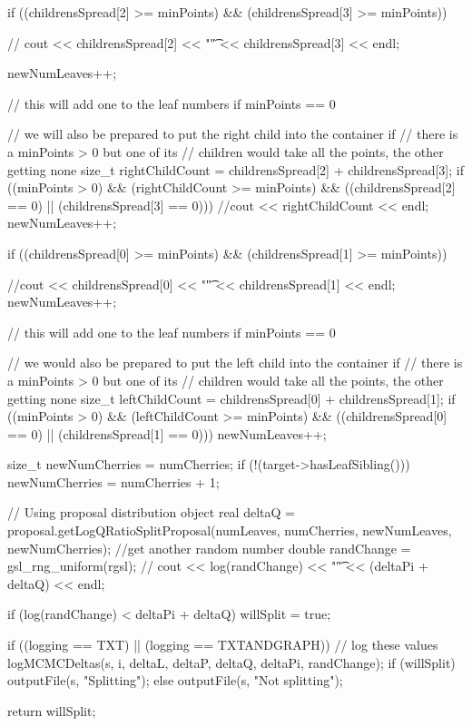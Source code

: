 \begin{DoxyCode}
{    if ((childrensSpread[2] >= minPoints) &&
    (childrensSpread[3] >= minPoints)) {
     //   cout << childrensSpread[2] << "\t" << childrensSpread[3] << endl;    
          
        newNumLeaves++;
    } // this will add one to the leaf numbers if minPoints == 0

    // we will also be prepared to put the right child into the container if
    // there is a minPoints > 0 but one of its
    // children would take all the points, the other getting none
    size_t rightChildCount = childrensSpread[2] + childrensSpread[3];
    if ((minPoints > 0) && (rightChildCount >= minPoints) &&
        ((childrensSpread[2] == 0) || (childrensSpread[3] == 0))) {
        //cout << rightChildCount << endl;
        newNumLeaves++;
    }

    if ((childrensSpread[0] >= minPoints) &&
    (childrensSpread[1] >= minPoints)) {
     
      //cout << childrensSpread[0] << "\t" << childrensSpread[1] << endl;
        newNumLeaves++;
    }  // this will add one to the leaf numbers if minPoints == 0

    // we would also be prepared to put the left child into the container if
    // there is a minPoints > 0 but one of its
    // children would take all the points, the other getting none
    size_t leftChildCount = childrensSpread[0] + childrensSpread[1];
    if ((minPoints > 0) && (leftChildCount >= minPoints) &&
        ((childrensSpread[0] == 0) || (childrensSpread[1] == 0))) {
        newNumLeaves++;
    }

    size_t newNumCherries = numCherries;
    if (!(target->hasLeafSibling())) newNumCherries = numCherries + 1;

    // Using proposal distribution object
    real deltaQ = proposal.getLogQRatioSplitProposal(numLeaves, numCherries,
                                                newNumLeaves, newNumCherries);
    //get another random number
    double randChange = gsl_rng_uniform(rgsl);
//  cout << log(randChange) << "\t" << (deltaPi + deltaQ) << endl;

    if (log(randChange) < deltaPi + deltaQ) { willSplit = true; }

    if ((logging == TXT) || (logging == TXTANDGRAPH)) { // log these values
        logMCMCDeltas(s, i, deltaL, deltaP, deltaQ, deltaPi, randChange);
        if (willSplit) outputFile(s, "Splitting");
        else outputFile(s, "Not splitting");
    }

    return willSplit;
}
\end{DoxyCode}
